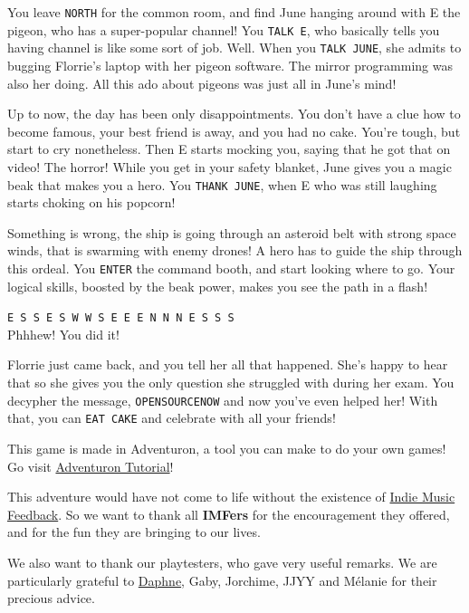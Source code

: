 \documentclass{article}
\newcommand{\bbro}[1] {\textbf{\textcolor{darksienna}{#1}}}
\newcommand{\bckg}[1]{\AddToShipoutPictureBG*{\texttt{[image: \#1]}}}
\begin{document}
You leave \texttt{NORTH} for the common room,
and find June hanging around with E the pigeon, who has a super-popular channel!
You \texttt{TALK E}, who basically tells you having channel is like some sort of job.
Well. When you \texttt{TALK JUNE}, she admits to bugging Florrie's laptop with her pigeon software.
The mirror programming was also her doing.
All this ado about pigeons was just all in June's mind!

Up to now, the day has been only disappointments.
You don't have a clue how to become famous, your best friend is away, and you had no cake.
You're tough, but start to cry nonetheless.
Then E starts mocking you, saying that he got that on video! The horror!
While you get in your safety blanket, June gives you a magic beak that makes you a hero.
You \texttt{THANK JUNE}, when E who was still laughing starts choking on his popcorn!

Something is wrong, the ship is going through an asteroid belt with strong space winds,
that is swarming with enemy drones! A hero has to guide the ship through this ordeal.
You \texttt{ENTER} the command booth, and start looking where to go.
Your logical skills, boosted by the beak power, makes you see the path in a flash!

\texttt{E S S E S W W S E E E N N N E S S S} \\
Phhhew! You did it!

Florrie just came back, and you tell her all that happened.
She's happy to hear that so she gives you the only question she struggled with during her exam.
You decypher the message, \texttt{OPENSOURCENOW} and now you've even helped her!
With that, you can \texttt{EAT CAKE} and celebrate with all your friends!

\clearpage

\bckg{img/bg}

This game is made in Adventuron, a tool you can make to do your own games!
Go visit \href{https://adventuron.io/documentation/tutorial-a.html}{Adventuron Tutorial}!

This adventure would have not come to life without the existence of \href{https://indiemusicfeedback.com}{Indie Music Feedback}.
So we want to thank all \bbro{IMFers} for the encouragement they offered, and for the fun they are bringing to our lives.

We also want to thank our playtesters, who gave very useful remarks.
We are particularly grateful to \href{https://daphnecerez.carrd.co/}{Daphne},
Gaby, Jorchime, JJYY and Mélanie for their precious advice.
\end{document}
